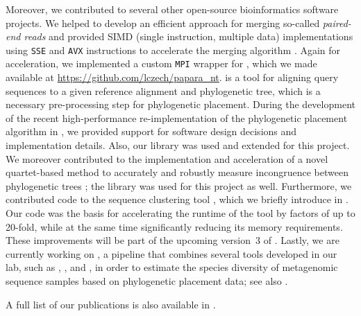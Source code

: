Moreover, we contributed to several other open-source bioinformatics software projects.
We helped to develop an efficient approach for merging so-called \emph{paired-end reads}
and provided SIMD (single instruction, multiple data) implementations using \texttt{SSE} and \texttt{AVX} instructions
to accelerate the merging algorithm \cite{Flouri2017}.
Again for acceleration, we implemented a custom \texttt{\acs{MPI}} wrapper for  \cite{Berger2011a,Berger2012},
which we made available at \url{https://github.com/lczech/papara_nt}.
 is a tool for aligning query sequences to a given reference alignment and phylogenetic tree,
which is a necessary pre-processing step for phylogenetic placement.
During the development of the recent high-performance re-implementation of the phylogenetic placement algorithm
in  \cite{Barbera2018}, we provided support for software design decisions and implementation details.
Also, our  library was used and extended for this project.
We moreover contributed to the implementation and acceleration of a novel quartet-based method to accurately and robustly
measure incongruence between phylogenetic trees \cite{Zhou2017};
the  library was used for this project as well.
Furthermore, we contributed code to the sequence clustering tool  \cite{Mahe2014,Mahe2015},
which we briefly introduce in .
Our code was the basis for accelerating the runtime of the tool by factors of up to \num{20}-fold,
while at the same time significantly reducing its memory requirements.
These improvements will be part of the upcoming version~3 of .
Lastly, we are currently working on ,
a pipeline that combines several tools developed in our lab, such as
 \cite{Barbera2018},  \cite{Morel2019}, and  \cite{Kapli2017},
in order to estimate the species diversity of metagenomic sequence samples based on phylogenetic placement data;
see also .

A full list of our publications is also available in .



